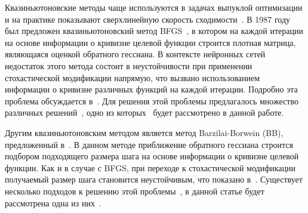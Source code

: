 \documentclass[preprint,12pt]{elsarticle}
\begin{document}
{Квазиньютоновские методы чаще используются в задачах выпуклой оптимизации и на практике показывают сверхлинейную скорость сходимости~\cite{numopt}. 
В 1987 году был предложен квазиньютоновский метод BFGS~\cite{BFGSorig}, в котором на каждой итерации на основе информации о кривизне целевой функции строится плотная матрица, являющаяся оценкой обратного гессиана.
В контексте нейронных сетей недостаток этого метода состоит в неустойчивости при применении стохастической модификации напрямую, что вызвано использованием информации о кривизне различных функций на каждой итерации. Подробно эта проблема обсуждается в~\cite{LBFGSunstable}. 
Для решения этой проблемы предлагалось множество различных решений~\cite{onlineBFGS, sampledbfgs, multibatchLBFGS}, одно из которых~\cite{multibatchLBFGS} будет рассмотрено в данной работе.

Другим квазиньютоновским методом является метод \linebreak Barzilai-Borwein (BB), предложенный в~\cite{BBorig}. 
В данном методе приближение обратного гессиана строится подбором подходящего размера шага на основе информации о кривизне целевой функции.
Как и в случае с BFGS, при переходе к стохастической модификации получаемый размер шага становится неустойчивым, что показано в~\cite{barzilaiborwein}. 
Существует несколько подходов к решению этой проблемы~\cite{barzilaiborwein, BB-DL}, в данной статье будет рассмотрена одна из них~\cite{BB-DL}.

}
\end{document}

